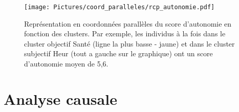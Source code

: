 \documentclass[11pt,fleqn,a4paper,openany,frenchb]{book} %
\begin{document}

\begin{figure}[!h]
\centering
\texttt{[image: Pictures/coord\_paralleles/rcp\_autonomie.pdf]}
\caption{Représentation en coordonnées parallèles du score d'autonomie en fonction des clusters. Par exemple, les individus à la fois dans le cluster objectif Santé (ligne la plus basse - jaune) et dans le cluster subjectif Heur (tout a gauche sur le graphique) ont un score d'autonomie moyen de 5,6.}
\label{fig:rcpautonomie}
\end{figure}



\chapter{Analyse causale}




%
%
\end{document}

